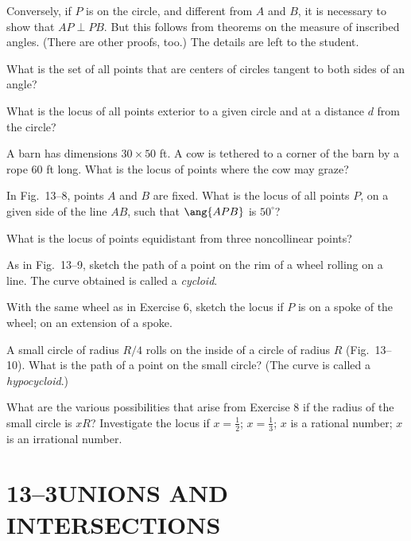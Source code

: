 \documentclass[11pt]{book}
\theoremstyle{bkplain}
\theoremstyle{XIplainnote}
\theoremstyle{bkplain}
\theoremstyle{bkplain}
\begin{document}
Conversely, if $P$ is on the circle, and different from $A$ and $B$, it is
necessary to show that $AP \perp PB$. But this follows from theorems on the
measure of inscribed angles. (There are other proofs, too.) The details are left
to the student.


\begin{exercisecols}
\begin{exlist}
\item What is the set of all points that are centers of circles tangent to both
      sides of an angle?
\item What is the locus of all points exterior to a given circle and at a
      distance $d$ from the circle?
\item A barn has dimensions $30 \times 50$ ft. A cow is tethered to a corner of
      the barn by a rope 60 ft long. What is the locus of points where the cow
      may graze?
\item[\stex 4.] In Fig.~13--8, points $A$ and $B$ are fixed. What is the locus
      of all points $P$, on a given side of the line $AB$, such that
      $\ang{APB}$ is $50^\circ$?
\exfig{\FIGXIIIEIGHT}
\item[5.] What is the locus of points equidistant from three noncollinear
      points?
\item[6.] As in Fig.~13--9, sketch the path of a point on the rim of a wheel
      rolling on a line. The curve obtained is called a \emph{cycloid}.
\exfig{\FIGXIIININE}
\item[\stex 7.] With the same wheel as in Exercise 6, sketch the locus if $P$ is
      on a spoke of the wheel; on an extension of a spoke.
\item[8.] A small circle of radius $R/4$ rolls on the inside of a circle of
      radius $R$ (Fig.~13--10). What is the path of a point on the small circle?
      (The curve is called a \emph{hypocycloid}.)
\exfig{\FIGXIIITEN}
\item[\stex 9.] What are the various possibilities that arise from Exercise 8 if
      the radius of the small circle is $xR$? Investigate the locus if
      $x = \frac{1}{2}$; $x = \frac{1}{3}$; $x$ is a rational number; $x$ is an
      irrational number.
\end{exlist}
\end{exercisecols}

\section*{13--3\quad UNIONS AND INTERSECTIONS}
\end{document}
